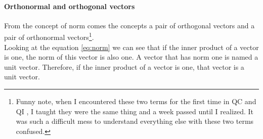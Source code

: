  
\paragraph{Orthonormal and orthogonal vectors}
From the concept of norm comes the concepts a pair of orthogonal vectors and a pair of orthonormal vectors\footnote{Funny note, when I encountered these two terms for the first time in QC and QI \tocite, I taught they were the same thing and a week passed until I realized. It was such a difficult mess to understand everything else with these two terms confused.}. \\
Looking at the equation \eqref{eq:norm} we can see that if the inner product of a vector is one, the norm of this vector is also one. A vector that has norm one is named a unit vector. Therefore, if the inner product of a vector is one, that vector is a unit vector.

